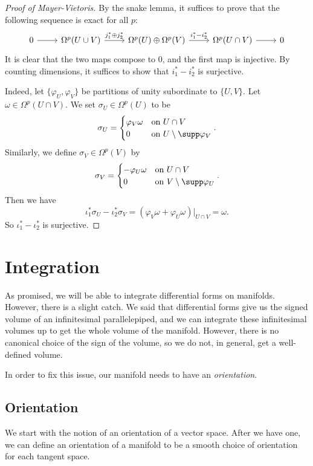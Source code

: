 \documentclass[a4paper]{article}
\begin{document}
\begin{proof}[Proof of Mayer-Vietoris]
  By the snake lemma, it suffices to prove that the following sequence is exact for all $p$:
  \[
    \begin{tikzcd}
      0 \ar[r] & \Omega^p(U \cup V) \ar[r, "j_1^* \oplus j_2^*"] & \Omega^p(U) \oplus \Omega^p(V) \ar[r, "i_1^* - i_2^*"] & \Omega^p(U \cap V) \ar[r] & 0
    \end{tikzcd}
  \]
  It is clear that the two maps compose to $0$, and the first map is injective. By counting dimensions, it suffices to show that $i_1^* - i_2^*$ is surjective.

  Indeed, let $\{\varphi_U, \varphi_V\}$ be partitions of unity subordinate to $\{U, V\}$. Let $\omega \in \Omega^p(U \cap V)$. We set $\sigma_U \in \Omega^p(U)$ to be
  \[
    \sigma_U =
    \begin{cases}
      \varphi_V \omega & \text{on }U \cap V\\
      0 & \text{on }U \setminus \supp \varphi_V
    \end{cases}.
  \]
  Similarly, we define $\sigma_V \in \Omega^p(V)$ by
  \[
    \sigma_V =
    \begin{cases}
      -\varphi_U \omega & \text{on }U \cap V\\
      0 & \text{on }V \setminus \supp \varphi_U
    \end{cases}.
  \]
  Then we have
  \[
    \iota_1^* \sigma_U - \iota_2^* \sigma_V = (\varphi_V \omega + \varphi_U \omega)|_{U \cap V} = \omega.
  \]
  So $\iota_1^* - \iota_2^*$ is surjective.
\end{proof}

\section{Integration}
As promised, we will be able to integrate differential forms on manifolds. However, there is a slight catch. We said that differential forms give us the signed volume of an infinitesimal parallelepiped, and we can integrate these infinitesimal volumes up to get the whole volume of the manifold. However, there is no canonical choice of the sign of the volume, so we do not, in general, get a well-defined volume.

In order to fix this issue, our manifold needs to have an \emph{orientation}.

\subsection{Orientation}
We start with the notion of an orientation of a vector space. After we have one, we can define an orientation of a manifold to be a smooth choice of orientation for each tangent space.
\end{document}
